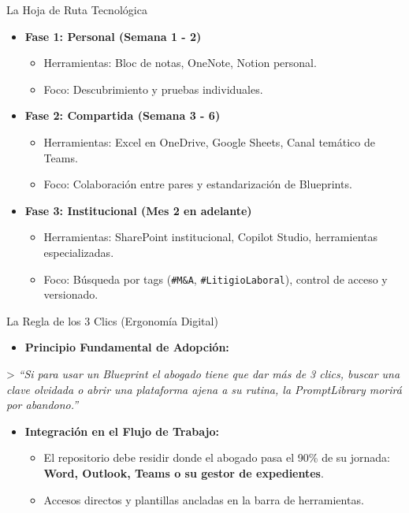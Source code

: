 \documentclass[aspectratio=169]{beamer}
\begin{document}
\begin{frame}{La Hoja de Ruta Tecnológica}

\begin{itemize}
  \item \textbf{Fase 1: Personal (Semana 1 - 2)}
  \begin{itemize}
    \item Herramientas: Bloc de notas, OneNote, Notion personal.
    \item Foco: Descubrimiento y pruebas individuales.
  \end{itemize}
  \item \textbf{Fase 2: Compartida (Semana 3 - 6)}
  \begin{itemize}
    \item Herramientas: Excel en OneDrive, Google Sheets, Canal temático de Teams.
    \item Foco: Colaboración entre pares y estandarización de Blueprints.
  \end{itemize}
  \item \textbf{Fase 3: Institucional (Mes 2 en adelante)}
  \begin{itemize}
    \item Herramientas: SharePoint institucional, Copilot Studio, herramientas especializadas.
    \item Foco: Búsqueda por tags (\texttt{\#M\&A}, \texttt{\#LitigioLaboral}), control de acceso y versionado.
  \end{itemize}
\end{itemize}
\end{frame}

\begin{frame}{La Regla de los 3 Clics (Ergonomía Digital)}

\begin{itemize}
  \item \textbf{Principio Fundamental de Adopción:}
\end{itemize}
> \textit{``Si para usar un Blueprint el abogado tiene que dar más de 3 clics, buscar una clave olvidada o abrir una plataforma ajena a su rutina, la PromptLibrary morirá por abandono.''}
\begin{itemize}
  \item \textbf{Integración en el Flujo de Trabajo:}
  \begin{itemize}
    \item El repositorio debe residir donde el abogado pasa el 90\% de su jornada: \textbf{Word, Outlook, Teams o su gestor de expedientes}.
    \item Accesos directos y plantillas ancladas en la barra de herramientas.
  \end{itemize}
\end{itemize}
\end{frame}
\end{document}
